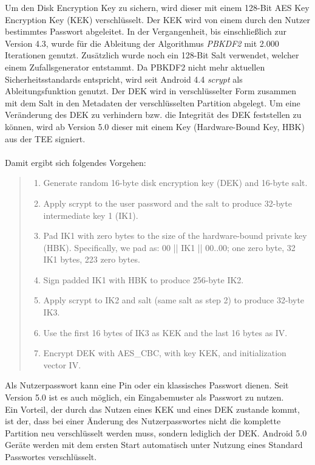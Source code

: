 	Um den Disk Encryption Key zu sichern, wird dieser mit einem 128-Bit AES Key Encryption Key (KEK) verschlüsselt. Der KEK wird von einem durch den Nutzer bestimmtes Passwort abgeleitet. In der Vergangenheit, bis einschließlich zur Version 4.3, wurde für die Ableitung der Algorithmus \textit{PBKDF2} mit 2.000 Iterationen genutzt. Zusätzlich wurde noch ein 128-Bit Salt verwendet, welcher einem Zufallsgenerator entstammt. Da PBKDF2 nicht mehr aktuellen Sicherheitsstandards entspricht, wird seit Android 4.4 \textit{scrypt} als Ableitungsfunktion genutzt. Der DEK wird in verschlüsselter Form zusammen mit dem Salt in den Metadaten der verschlüsselten Partition abgelegt. Um eine Veränderung des DEK zu verhindern bzw. die Integrität des DEK feststellen zu können, wird ab Version 5.0 dieser mit einem Key (Hardware-Bound Key, HBK) aus der TEE signiert. \\\\
	Damit ergibt sich folgendes Vorgehen:
	\begin{quote}
		\begin{enumerate}
		   \item Generate random 16-byte disk encryption key (DEK) and 16-byte salt.
		   \item Apply scrypt to the user password and the salt to produce 32-byte intermediate key 1 (IK1).
		   \item Pad IK1 with zero bytes to the size of the hardware-bound private key (HBK). Specifically, we pad as: 00 || IK1 || 00..00; one zero byte, 32 IK1 bytes, 223 zero bytes.
		   \item Sign padded IK1 with HBK to produce 256-byte IK2.
		   \item Apply scrypt to IK2 and salt (same salt as step 2) to produce 32-byte IK3.
		   \item Use the first 16 bytes of IK3 as KEK and the last 16 bytes as IV.
		   \item Encrypt DEK with AES\_CBC, with key KEK, and initialization vector IV. 
	   \end{enumerate}
	   \cite{AndroidCrypt}
	\end{quote}
	Als Nutzerpasswort kann eine Pin oder ein klassisches Passwort dienen. Seit Version 5.0 ist es auch möglich, ein Eingabemuster als Passwort zu nutzen. \\
	Ein Vorteil, der durch das Nutzen eines KEK und eines DEK zustande kommt, ist der, dass bei einer Änderung des Nutzerpasswortes nicht die komplette Partition neu verschlüsselt werden muss, sondern lediglich der DEK. Android 5.0 Geräte werden mit dem ersten Start automatisch unter Nutzung eines Standard Passwortes verschlüsselt. 
	
